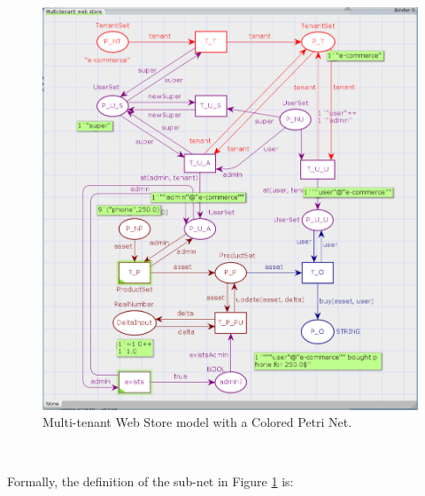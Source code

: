 \documentclass[12pt,english]{article} %
\begin{document}
\begin{figure}[H]
    \centering
    \includegraphics[scale=0.65]{img/mws/cpn/mws_cpn_order_finished.png}
    \caption{Multi-tenant Web Store model with a Colored Petri Net.}
    \label{fig:mws-cpn-order-finished}
\end{figure} %

\

Formally, the definition of the sub-net in Figure \ref{fig:mws-cpn-order-finished} is:
\end{document}

